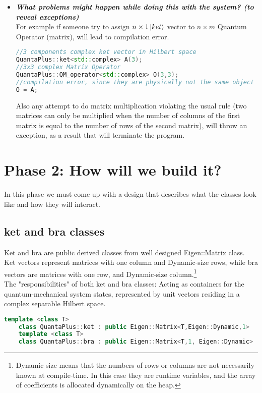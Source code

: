 \documentclass[10pt,a4paper]{article}
\begin{document}
\begin{itemize}
	\item\textit{\bf What problems might happen while doing this with the system? (to reveal exceptions)}\\
	For example if someone try to assign $n\times1\ket{ket}$ vector to $n\times m$ Quantum Operator (matrix), will lead to compilation error.
	\begin{lstlisting}[language=c++, caption=error example]
//3 components complex ket vector in Hilbert space
QuantaPlus::ket<std::complex> A(3);
//3x3 complex Matrix Operator
QuantaPlus::QM_operator<std::complex> O(3,3);
//compilation error, since they are physically not the same object
O = A; 
	\end{lstlisting}
	 Also any attempt to do matrix multiplication violating the usual rule (two matrices can only be multiplied when the number of columns of the first matrix is equal to the number of rows of the second matrix), will throw an exception, as a result that will terminate the program.
\end{itemize}


\section{Phase 2: How will we build it?}
In this phase we must come up with a design that describes what the classes look like and how they will interact.
\subsection{ket and bra classes}
Ket and bra are public derived classes from  well designed Eigen::Matrix class.
Ket vectors represent matrices with one column and Dynamic-size rows, while bra vectors are matrices with one row, and Dynamic-size column.\footnote{Dynamic-size means that the numbers of rows or columns are not necessarily known at compile-time. In this case they are runtime variables, and the array of coefficients is allocated dynamically on the heap.}\\

The "responsibilities" of both ket and bra classes: Acting as containers for the quantum-mechanical system states, represented by unit vectors residing in a complex separable Hilbert space.
\begin{lstlisting}[language=c++, caption=the ket and bra classes]
	template <class T> 
	class QuantaPlus::ket : public Eigen::Matrix<T,Eigen::Dynamic,1>
	template <class T> 
	class QuantaPlus::bra : public Eigen::Matrix<T,1, Eigen::Dynamic>
\end{lstlisting}
\end{document}
